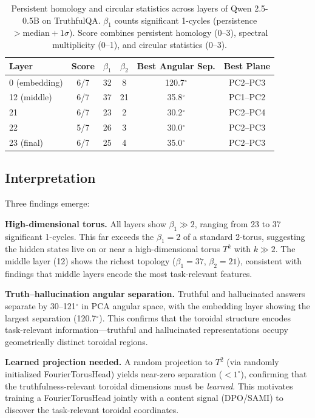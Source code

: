 \documentclass[11pt,a4paper]{article}
\begin{document}
\begin{table}[h]
\centering
\begin{tabular}{lccccc}
\toprule
\textbf{Layer} & \textbf{Score} & $\beta_1$ & $\beta_2$ & \textbf{Best Angular Sep.} & \textbf{Best Plane} \\
\midrule
0 (embedding) & 6/7 & 32 & 8 & 120.7$^\circ$ & PC2--PC3 \\
12 (middle) & 6/7 & 37 & 21 & 35.8$^\circ$ & PC1--PC2 \\
21 & 6/7 & 23 & 2 & 30.2$^\circ$ & PC2--PC4 \\
22 & 5/7 & 26 & 3 & 30.0$^\circ$ & PC2--PC3 \\
23 (final) & 6/7 & 25 & 4 & 35.0$^\circ$ & PC2--PC3 \\
\bottomrule
\end{tabular}
\caption{Persistent homology and circular statistics across layers of Qwen 2.5-0.5B on TruthfulQA. $\beta_1$ counts significant 1-cycles (persistence $> \text{median} + 1\sigma$). Score combines persistent homology (0--3), spectral multiplicity (0--1), and circular statistics (0--3).}
\label{tab:torus_detection}
\end{table}

\subsection{Interpretation}

Three findings emerge:

\textbf{High-dimensional torus.} All layers show $\beta_1 \gg 2$, ranging from 23 to 37 significant 1-cycles. This far exceeds the $\beta_1 = 2$ of a standard 2-torus, suggesting the hidden states live on or near a high-dimensional torus $T^k$ with $k \gg 2$. The middle layer (12) shows the richest topology ($\beta_1 = 37$, $\beta_2 = 21$), consistent with findings that middle layers encode the most task-relevant features.

\textbf{Truth--hallucination angular separation.} Truthful and hallucinated answers separate by 30--121$^\circ$ in PCA angular space, with the embedding layer showing the largest separation (120.7$^\circ$). This confirms that the toroidal structure encodes task-relevant information---truthful and hallucinated representations occupy geometrically distinct toroidal regions.

\textbf{Learned projection needed.} A random projection to $T^2$ (via randomly initialized FourierTorusHead) yields near-zero separation ($<1^\circ$), confirming that the truthfulness-relevant toroidal dimensions must be \emph{learned}. This motivates training a FourierTorusHead jointly with a content signal (DPO/SAMI) to discover the task-relevant toroidal coordinates.
\end{document}
